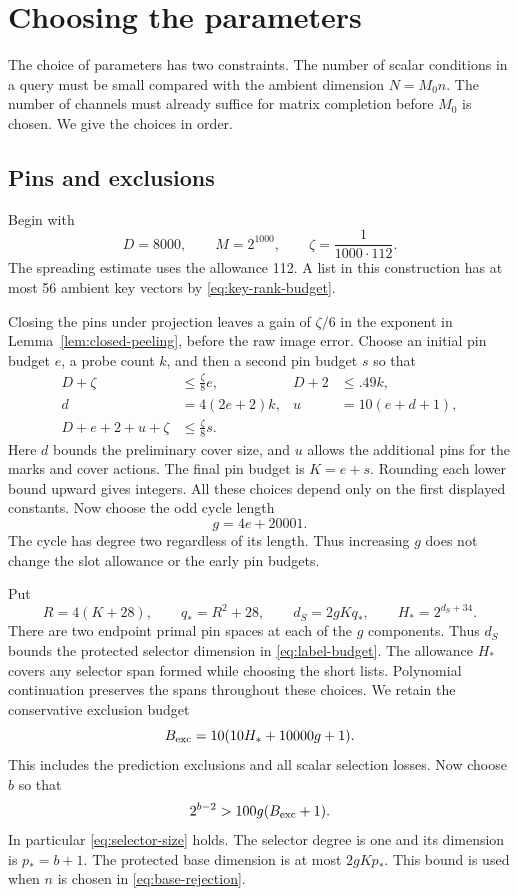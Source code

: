 \section{Choosing the parameters}\label{sec:parameters}

The choice of parameters has two constraints. The number of scalar
conditions in a query must be small compared with the ambient dimension
\(N=M_0n\). The number of channels must already suffice for matrix
completion before \(M_0\) is chosen. We give the choices in order.

\subsection{Pins and exclusions}

Begin with
\[
 D=8000,\qquad M=2^{1000},\qquad
 \zeta=\frac1{1000\cdot112}.
\]
The spreading estimate uses the allowance 112. A list in this
construction has at most 56 ambient key vectors by \eqref{eq:key-rank-budget}.

Closing the pins under projection leaves a gain of \(\zeta/6\) in the
exponent in Lemma~\ref{lem:closed-peeling}, before the raw image error.
Choose an initial
pin budget \(e\), a probe count \(k\), and then a second pin budget \(s\)
so that
\begin{align*}
 D+\zeta&\le\frac{\zeta}{8}e,& D+2&\le .49k,\\
 d&=4(2e+2)k,& u&=10(e+d+1),\\
 D+e+2+u+\zeta&\le\frac{\zeta}{8}s.&
\end{align*}
Here \(d\) bounds the preliminary cover size, and \(u\) allows the
additional pins for the marks and cover actions. The final pin budget is
\(K=e+s\). Rounding each lower bound upward gives integers.
All these choices depend only on the first displayed constants.
Now choose the odd cycle length
\[
 g=4e+20001.
\]
The cycle has degree two regardless of its length. Thus increasing \(g\)
does not change the slot allowance or the early pin budgets.

Put
\[
 R=4(K+28),\qquad q_*=R^2+28,\qquad
 d_S=2gKq_*,\qquad H_*=2^{d_S+34}.
\]
There are two endpoint primal pin spaces at each of the \(g\) components.
Thus \(d_S\) bounds the protected selector dimension in
\eqref{eq:label-budget}. The allowance \(H_*\) covers any selector span
formed while choosing the short lists. Polynomial continuation preserves
the spans throughout these choices. We retain the conservative exclusion
budget
\[
 B_{\rm exc}=10(10H_*+10000g+1).
\]
This includes the prediction exclusions and all scalar selection losses.
Now choose \(b\) so that
\[
 2^{b-2}>100g(B_{\rm exc}+1).
\]
In particular \eqref{eq:selector-size} holds. The selector degree is one
and its dimension is \(p_*=b+1\). The protected base dimension is at most \(2gKp_*\). This bound is
used when \(n\) is chosen in \eqref{eq:base-rejection}.

